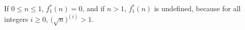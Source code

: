 If $0\le n\le1$, $f_1^*(n)=0$, and if $n>1$, $f_1^*(n)$ is undefined, because for all integers $i\ge0$, $\bigl(\sqrt{n}\bigr)^{(i)}>1$.
